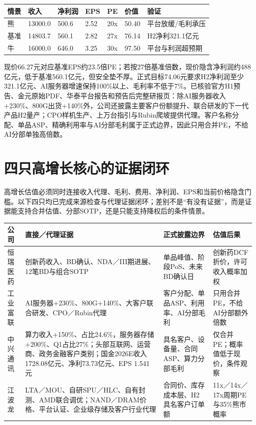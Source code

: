 \begin{exhibitbox}
\begin{tabularx}{\textwidth}{L{1.4cm}R{1.55cm}R{1.55cm}R{1.25cm}R{1.15cm}R{1.35cm}X}
\toprule
\textbf{情景} & \textbf{收入} & \textbf{净利润} & \textbf{EPS} & \textbf{PE} & \textbf{价值} & \textbf{验证} \\
\midrule
熊 & 13000.0 & 500.6 & 2.52 & 20x & 50.40 & 平台放缓/毛利承压 \\
基准 & 14803.7 & 560.1 & 2.82 & 27x & 76.14 & H2净利321.1亿元 \\
牛 & 16000.0 & 646.0 & 3.25 & 30x & 97.50 & 平台与利润超预期 \\
\bottomrule
\end{tabularx}
\end{exhibitbox}

现价66.27元对应基准EPS约23.5倍PE；若按27倍基准倍数，现价隐含净利润约488亿元，低于基准560.1亿元，但安全垫不厚。正式目标74.06元要求H2净利润至少321.1亿元、AI服务器增速保持100\%以上、毛利率不低于7\%。已核验官方H1预告、金元原始PDF、华泰平台报告和预告后完整研报页：除AI服务器收入+230\%、800G出货+140\%外，公司还披露主要客户份额提升、联合研发的下一代产品H2量产；CPO样机生产、上万台指引与Rubin爬坡提供代理。客户名称分配、单品ASP、精确利用率与AI分部毛利属于正式边界，因此只用合并PE，不给AI分部单独高倍数。

\section{四只高增长核心的证据闭环}

高增长估值必须同时连接收入代理、毛利、费用、净利润、EPS和当前价格隐含门槛。以下四只均已完成来源检查与代理证据闭环；差别不是“有没有证据”，而是证据能支持合并估值、分部SOTP，还是只能支持降权后的条件情景。

\fontsize{7.5pt}{10pt}\selectfont
\noindent
\begin{tabularx}{\textwidth}{L{1.35cm}L{5.10cm}L{4.00cm}X}
\toprule
\textbf{公司} & \textbf{直接／代理证据} & \textbf{正式披露边界} & \textbf{估值后果} \\
\midrule
恒瑞医药 & 创新药收入、BD确认、NDA／III期进展、12笔BD与组合SOTP & 单品峰值、阶段PoS、未来BD确认日 & 创新药DCF折价，许可收入概率加权 \\
工业富联 & AI服务器+230\%、800G+140\%、大客户联合研发、CPO／Rubin代理 & 客户分配、单品ASP、利用率、AI分部毛利 & 只用合并PE，不给AI分部额外倍数 \\
中兴通讯 & 算力收入+150\%、占比24.6\%，服务器存储+200\%、Q1占比27\%；头部互联网、运营商、政务金融客户类别；国金2026E收入1728.08亿元、净利73.73亿元、EPS 1.541元 & 具名客户、设备量、合同ASP、算力分部毛利 & 仅合并PE；概率值低于现价，条件观察 \\
江波龙 & LTA／MOU、自研SPU／HLC、自有封测、AMD联合调优；NAND／DRAM价格、平台认证、企业级存储及客户行业代理 & 合同价、库存成本层、H2具名客户订单额 & 11x／14x／17x周期PE与35\%熊市概率 \\
\bottomrule
\end{tabularx}
\normalsize
{}
